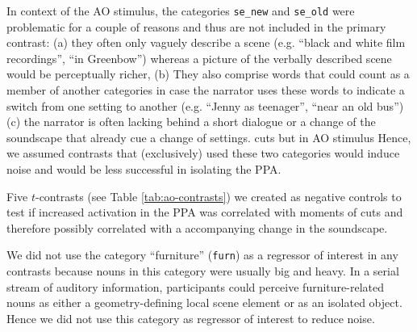 \documentclass[english]{article}
\begin{document}
In context of the AO stimulus, the categories \texttt{se\_new} and
\texttt{se\_old} were problematic for a couple of reasons and thus are not
included in the primary contrast:
(a) they often only vaguely describe a scene (e.g. ``black and white film
recordings'', ``in Greenbow'') whereas a picture of the verbally described scene
would be perceptually richer,
(b) They also comprise words that could count as a member of another categories
in case the narrator uses these words to indicate a switch from one setting to
another (e.g. ``Jenny as teenager'', ``near an old bus'')
(c) the narrator is often lacking behind a short dialogue or a change of the
soundscape that already cue a change of settings.
cuts but in AO stimulus
Hence, we assumed contrasts that (exclusively) used these two categories would
induce noise and would be less successful in isolating the PPA.

Five $t$-contrasts (see Table \ref{tab:ao-contrasts}) we created as negative
controls to test if increased activation in the PPA was correlated with
moments of cuts and therefore possibly correlated with a accompanying change in
the soundscape.

We did not use the category ``furniture'' (\texttt{furn}) as a
regressor of interest in any contrasts because nouns in this category were
usually big and heavy. In a serial stream of auditory information, participants
could perceive furniture-related nouns as either a geometry-defining local scene
element or as an isolated object. Hence we did not use this category as
regressor of interest to reduce noise.
\end{document}
